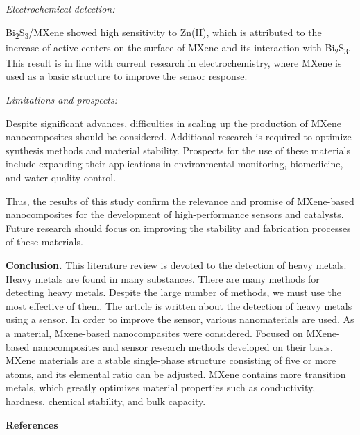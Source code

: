 \begin{multicols}{2}
\emph{Electrochemical detection:}

Bi\textsubscript{2}S\textsubscript{3}/MXene showed high sensitivity
to Zn(II), which is attributed to the increase of active centers
on the surface of MXene and its interaction with
Bi\textsubscript{2}S\textsubscript{3}. This result is in line with
current research in electrochemistry, where MXene is used as a
basic structure to improve the sensor response.

\emph{Lim}\emph{itations and prospects:}

Despite significant advances, difficulties in scaling up the
production of MXene nanocomposites should be considered.
Additional research is required to optimize synthesis methods and
material stability. Prospects for the use of these materials
include expanding their applications in environmental monitoring,
biomedicine, and water quality control.

Thus, the results of this study confirm the relevance and
promise of MXene-based nanocomposites for the development of
high-performance sensors and catalysts. Future research should
focus on improving the stability and fabrication processes of
these materials.

{\bfseries Conclusion.} This literature review is devoted to the
detection of heavy metals. Heavy metals are found in many
substances. There are many methods for detecting heavy metals.
Despite the large number of methods, we must use the most
effective of them. The article is written about the detection of
heavy metals using a sensor. In order to improve the sensor,
various nanomaterials are used. As a material, Mxene-based
nanocompasites were considered. Focused on MXene-based
nanocomposites and sensor research methods developed on their
basis. MXene materials are a stable single-phase structure
consisting of five or more atoms, and its elemental ratio can
be adjusted. MXene contains more transition metals, which
greatly optimizes material properties such as conductivity,
hardness, chemical stability, and bulk capacity.
\end{multicols}

\begin{center}
{\bfseries References}
\end{center}

